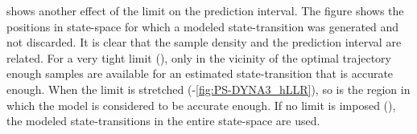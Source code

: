  shows another effect of the limit on the prediction interval. The figure shows the positions in state-space for which a modeled state-transition was generated and not discarded. It is clear that the sample density and the prediction interval are related. For a very tight limit (), only in the vicinity of the optimal trajectory enough samples are available for an estimated state-transition that is accurate enough. When the limit is stretched (-\ref{fig:PS-DYNA3_hLLR}), so is the region in which the model is considered to be accurate enough. If no limit is imposed (), the modeled state-transitions in the entire state-space are used.

\begin{figure}[htbp]
	\centering
	\\
\end{figure}

